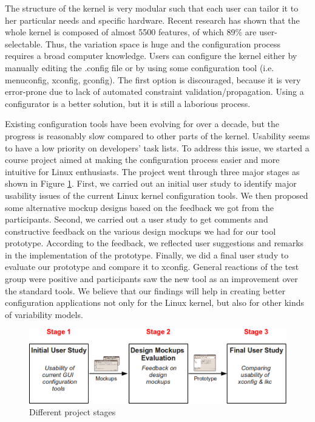 \documentclass{chi2009}
\begin{document}
The structure of the kernel is very modular such that each user can tailor it to her particular needs and specific hardware. Recent research
\cite{she:kernel:2010} has shown that the whole kernel is composed of almost 5500 features, of which 89\% are user-selectable. Thus, the variation space is huge
and the configuration process requires a broad computer knowledge. Users can configure the kernel either by manually editing the \textsf{.config} file or by
using some configuration tool (i.e. \textsf{menuconfig, xconfig, gconfig}). The first option is discouraged, because it is very error-prone due to lack of
automated constraint validation/propagation. Using a configurator is a better solution, but it is still a laborious process.

Existing configuration tools have been evolving for over a decade, but the progress is reasonably slow compared to other parts of the kernel. Usability seems to
have a low priority on developers' task lists. To address this issue, we started a course project aimed at making the configuration process easier and more
intuitive for Linux enthusiasts. The project went through three major stages as shown in Figure \ref{fig:flow}. First, we carried out an initial user study
to identify major usability issues of the current Linux kernel configuration tools. We then proposed some alternative mockup designs based on the feedback we
got from the participants. Second, we carried out a user study to get comments and constructive feedback on the various design mockups we had for our tool
prototype. According to the feedback, we reflected user suggestions and remarks in the implementation of the prototype. Finally, we did a final user study to
evaluate our prototype and compare it to \textsf{xconfig}. General reactions of the test group were positive and participants saw the new tool as an improvement
over the standard tools. We believe that our findings will help in creating better configuration applications not only for the Linux kernel, but also for other
kinds of variability models.

\begin{figure}[!t]
 \centering
 \includegraphics[scale=0.5,keepaspectratio=true]{figs/flow}
 \caption{Different project stages}
\label{fig:flow}
\end{figure}
\end{document}
